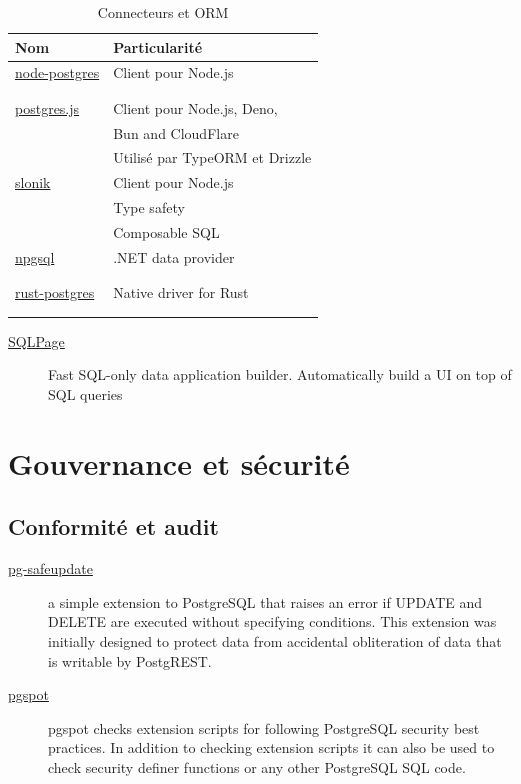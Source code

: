 \documentclass[a4paper,12pt]{article}
\begin{document}
\begin{multicols*}{2}
\begin{table}[H]
\caption{Connecteurs et ORM}
\centering
\begin{tabular}{ll}
Nom & Particularité\\
\hline
\href{https://github.com/brianc/node-postgres}{node-postgres} & Client pour Node.js\\
 & \\
 & \\
\href{https://github.com/porsager/postgres}{postgres.js} & Client pour Node.js, Deno,\\
 & Bun and CloudFlare\\
 & Utilisé par TypeORM et Drizzle\\
\href{https://github.com/gajus/slonik}{slonik} & Client pour Node.js\\
 & Type safety\\
 & Composable SQL\\
\href{https://github.com/npgsql/npgsql}{npgsql} & .NET data provider\\
 & \\
 & \\
\href{https://github.com/sfackler/rust-postgres}{rust-postgres} & Native driver for Rust\\
 & \\
 & \\
\end{tabular}
\end{table}

\begin{description}
\item[{\href{https://github.com/sqlpage/SQLPage}{SQLPage}}] Fast SQL-only data application builder. Automatically build a UI on top of SQL queries
\end{description}
\section*{Gouvernance et sécurité}
\label{sec:org8dab8d7}
\subsection*{Conformité et audit}
\label{sec:orge5e59d4}
\begin{description}
\item[{\href{https://github.com/eradman/pg-safeupdate}{pg-safeupdate}}] a simple extension to PostgreSQL that raises an error if UPDATE and DELETE are executed without specifying conditions. This extension was initially designed to protect data from accidental obliteration of data that is writable by PostgREST.
\item[{\href{https://github.com/timescale/pgspot}{pgspot}}] pgspot checks extension scripts for following PostgreSQL security best practices. In addition to checking extension scripts it can also be used to check security definer functions or any other PostgreSQL SQL code.
\end{description}


\end{multicols*}
\end{document}
